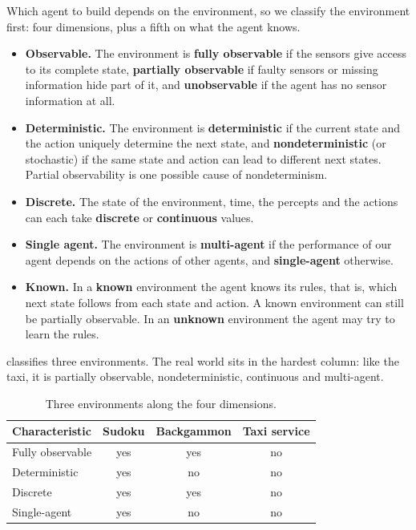 Which agent to build depends on the environment, so we classify the
environment first: four dimensions, plus a fifth on what the agent knows.
\begin{itemize}
  \item \textbf{Observable.} The environment is \textbf{fully observable} if the
    sensors give access to its complete state, \textbf{partially observable} if
    faulty sensors or missing information hide part of it, and
    \textbf{unobservable} if the agent has no sensor information at all.
  \item \textbf{Deterministic.} The environment is \textbf{deterministic} if the
    current state and the action uniquely determine the next state, and
    \textbf{nondeterministic} (or stochastic) if the same state and action can
    lead to different next states. Partial observability is one possible cause
    of nondeterminism.
  \item \textbf{Discrete.} The state of the environment, time, the percepts and
    the actions can each take \textbf{discrete} or \textbf{continuous} values.
  \item \textbf{Single agent.} The environment is \textbf{multi-agent} if the
    performance of our agent depends on the actions of other agents, and
    \textbf{single-agent} otherwise.
  \item \textbf{Known.} In a \textbf{known} environment the agent knows its rules,
    that is, which next state follows from each state and action. A known
    environment can still be partially observable. In an \textbf{unknown}
    environment the agent may try to learn the rules.
\end{itemize}

 classifies three environments. The real world sits in
the hardest column: like the taxi, it is partially observable,
nondeterministic, continuous and multi-agent.

\begin{table}[htbp]
  \centering
  \renewcommand{\arraystretch}{1.08}
  \caption{Three environments along the four dimensions.}\label{tab:env-examples}
  \begin{tabular}{@{}lccc@{}}
    \toprule
    \textbf{Characteristic} & \textbf{Sudoku} & \textbf{Backgammon} &
      \textbf{Taxi service} \\
    \midrule
    Fully observable & yes & yes & no \\
    Deterministic    & yes & no  & no \\
    Discrete         & yes & yes & no \\
    Single-agent     & yes & no  & no \\
    \bottomrule
  \end{tabular}
\end{table}

